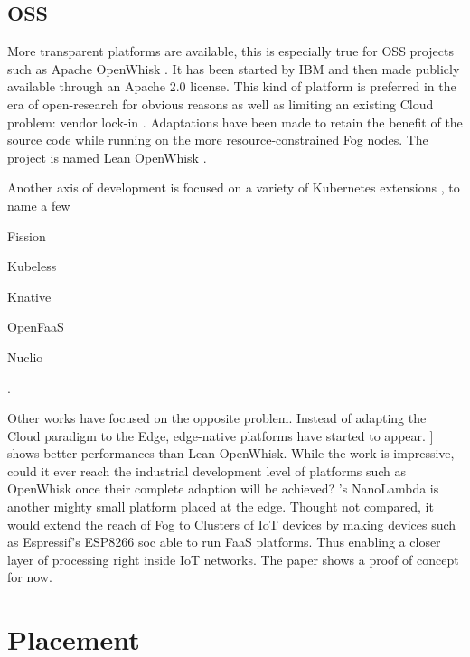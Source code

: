 \documentclass[11pt]{sdm}
\begin{document}
\hypersetup{linkcolor=}
\subsection{\acrfull{OSS}}
More transparent platforms are available, this is especially true for \gls{OSS} projects such as Apache OpenWhisk \cite{noauthor_apache_nodate}. It has been started by IBM and then made publicly available through an Apache 2.0 license. This kind of platform is preferred in the era of open-research for obvious reasons as well as limiting an existing Cloud problem: vendor lock-in \cite{kjorveziroski_iot_2021}. Adaptations have been made to retain the benefit of the source code while running on the more resource-constrained Fog nodes. The project is named Lean OpenWhisk \cite{breitgand_lean_2018}.

Another axis of development is focused on a variety of Kubernetes extensions \cite{bocci_secure_2021}, to name a few
\begin{enumerate*}[(a)]
\item Fission
\item Kubeless
\item Knative
\item OpenFaaS
\item Nuclio
\end{enumerate*}.

Other works have focused on the opposite problem. Instead of adapting the Cloud paradigm to the Edge, edge-native platforms have started to appear. \citet{pfandzelter_tinyfaas_2020}] shows better performances than Lean OpenWhisk. While the work is impressive, could it ever reach the industrial development level of platforms such as OpenWhisk once their complete adaption will be achieved? 's NanoLambda is another mighty small platform placed at the edge. Thought not compared, it would extend the reach of Fog to Clusters of IoT devices by making devices such as Espressif's ESP8266 soc \cite{noauthor_esp8266_nodate} able to run \gls{FaaS} platforms. Thus enabling a closer layer of processing right inside IoT networks. The paper shows a proof of concept for now.


\section{Placement}
\end{document}
